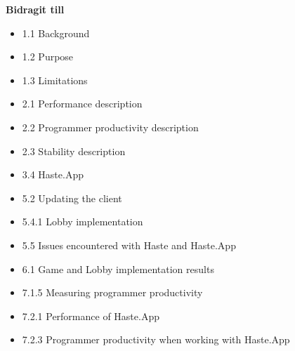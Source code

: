 \textbf{Bidragit till}
\begin{itemize}
    \item 1.1 Background
    \item 1.2 Purpose
    \item 1.3 Limitations
    \item 2.1 Performance description
    \item 2.2 Programmer productivity description
    \item 2.3 Stability description
    \item 3.4 Haste.App
    \item 5.2 Updating the client
    \item 5.4.1 Lobby implementation
    \item 5.5 Issues encountered with Haste and Haste.App
    \item 6.1 Game and Lobby implementation results
    \item 7.1.5 Measuring programmer productivity
    \item 7.2.1 Performance of Haste.App
    \item 7.2.3 Programmer productivity when working with Haste.App
\end{itemize}